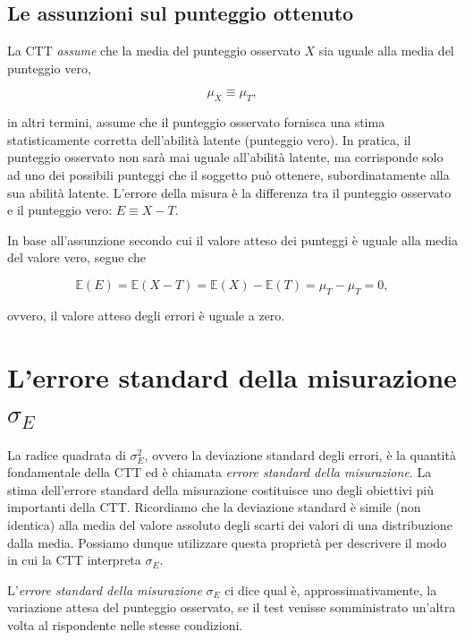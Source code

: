 \documentclass[
  11pt,
]{krantz}
\newcommand{\E}{\mathbb{E}} %
\theoremstyle{definition}
\theoremstyle{definition}
\theoremstyle{definition}
\theoremstyle{definition}
\theoremstyle{remark}
\begin{document}
\hypertarget{le-assunzioni-sul-punteggio-ottenuto}{%
\subsection{Le assunzioni sul punteggio ottenuto}\label{le-assunzioni-sul-punteggio-ottenuto}}

La CTT \emph{assume} che la media del punteggio osservato \(X\) sia uguale alla media del punteggio vero,

\[
\mu_X \equiv \mu_{T},
\label{eq:assunzione-media-x-media-t}
\]

in altri termini, assume che il punteggio osservato fornisca una stima statisticamente corretta dell'abilità latente (punteggio vero). In pratica, il punteggio osservato non sarà mai uguale all'abilità latente, ma corrisponde solo ad uno dei possibili punteggi che il soggetto può ottenere, subordinatamente alla sua abilità latente. L'errore della misura è la differenza tra il punteggio osservato e il punteggio vero: \(E \equiv X - T.\)

In base all'assunzione secondo cui il valore atteso dei punteggi è uguale alla media del valore vero, segue che

\[
\E(E) = \E(X - T) = \E(X) - \E(T) = \mu_{T} - \mu_{T} = 0,
\]

ovvero, il valore atteso degli errori è uguale a zero.

\hypertarget{lerrore-standard-della-misurazione-sigma_e}{%
\section{\texorpdfstring{L'errore standard della misurazione \(\sigma_E\)}{L'errore standard della misurazione \textbackslash sigma\_E}}\label{lerrore-standard-della-misurazione-sigma_e}}

La radice quadrata di \(\sigma^2_E\), ovvero la deviazione standard degli errori, è la quantità fondamentale della CTT ed è chiamata \emph{errore standard della misurazione}. La stima dell'errore standard della misurazione costituisce uno degli obiettivi più importanti della CTT. Ricordiamo che la deviazione standard è simile (non identica) alla media del valore assoluto degli scarti dei valori di una distribuzione dalla media. Possiamo dunque utilizzare questa proprietà per descrivere il modo in cui la CTT interpreta \(\sigma_E\).

L'\emph{errore standard della misurazione} \(\sigma_E\) ci dice qual è, approssimativamente, la variazione attesa del punteggio osservato, se il test venisse somministrato un'altra volta al rispondente nelle stesse condizioni.
\end{document}
